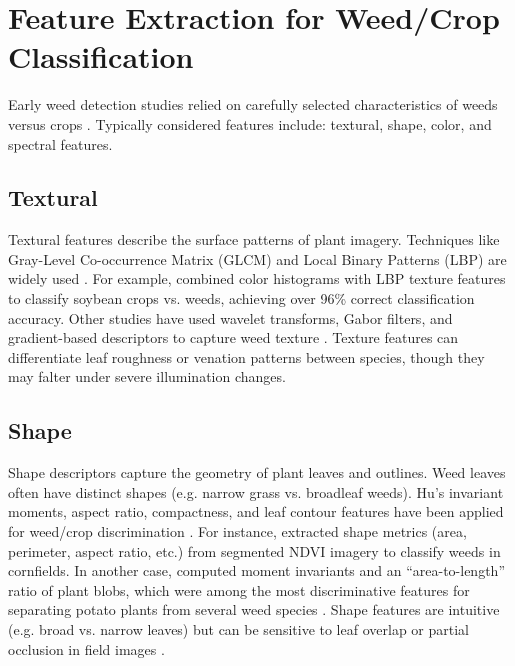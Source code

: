 \documentclass[letterpaper, notitlepage]{report}
\begin{document}
\section{Feature Extraction for Weed/Crop Classification}  
Early weed detection studies relied on carefully selected  characteristics of weeds versus crops \parencite{Wu2021-gt}. Typically considered features include: textural, shape, color, and spectral features.  

\subsection{Textural}
	Textural features describe the surface patterns of plant imagery. Techniques like Gray-Level Co-occurrence Matrix (\gls{GLCM}) and Local Binary Patterns (\gls{LBP}) are widely used \parencite{Mekhalfa2021-np}. For example, \citeauthor{Mekhalfa2021-np} combined color histograms with LBP texture features to classify soybean crops vs. weeds, achieving over 96\% correct classification accuracy. Other studies have used wavelet transforms, Gabor filters, and gradient-based descriptors to capture weed texture \parencite{Wu2021-gt}. Texture features can differentiate leaf roughness or venation patterns between species, though they may falter under severe illumination changes.
\subsection{Shape} 
	Shape descriptors capture the geometry of plant leaves and outlines. Weed leaves often have distinct shapes (e.g. narrow grass vs. broadleaf weeds). Hu’s invariant moments, aspect ratio, compactness, and leaf contour features have been applied for weed/crop discrimination \parencite{Ahsen2024-tr, Bazrafkan2024-bl}. For instance, \citeauthor{Bazrafkan2024-bl} extracted shape metrics (area, perimeter, aspect ratio, etc.) from segmented \gls{NDVI} imagery to classify weeds in cornfields. In another case, \citeauthor{Sabzi2020-af} computed moment invariants and an “area-to-length” ratio of plant blobs, which were among the most discriminative features for separating potato plants from several weed species \parencite{Sabzi2020-af}. Shape features are intuitive (e.g. broad vs. narrow leaves) but can be sensitive to leaf overlap or partial occlusion in field images \parencite{Sabzi2020-af}.
\end{document}
